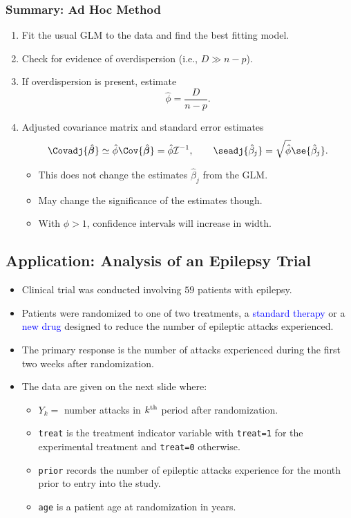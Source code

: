 \documentclass[oneside]{book}\usepackage[]{graphicx}\usepackage[svgnames]{xcolor}
\providecommand{\Vector}[1]{\bm{#1}}%
\begin{document}
\subsubsection*{Summary: Ad Hoc Method}
\begin{enumerate}[1.]
    \item Fit the usual GLM to the data and find the best fitting model.
    \item Check for evidence of overdispersion (i.e., $ D\gg n-p $).
    \item If overdispersion is present, estimate
          \[ \hat{\phi}=\frac{D}{n-p}. \]
    \item Adjusted covariance matrix and standard error estimates
          \[ \Covadj{\hat{\Vector{\beta}}}\simeq \hat{\phi}\Cov{\hat{\Vector{\beta}}}=\hat{\phi}\mathcal{I}^{-1},
              \qquad \seadj{\hat{\beta}_j}=\sqrt{\hat{\phi}}\se{\hat{\beta}_j}. \]
          \begin{itemize}
              \item This does not change the estimates $ \hat{\beta}_j $ from the GLM.
              \item May change the significance of the estimates though.
              \item With $ \phi>1 $, confidence intervals will increase in width.
          \end{itemize}
\end{enumerate}
\subsection*{Application: Analysis of an Epilepsy Trial}
\begin{itemize}
    \item Clinical trial was conducted involving $59$ patients with epilepsy.
    \item Patients were randomized to one of two treatments, a \textcolor{Blue}{standard therapy} or a \textcolor{Blue}{new drug}
          designed to reduce the number of epileptic attacks experienced.
    \item The primary response is the number of attacks experienced during the first two
          weeks after randomization.
    \item The data are given on the next slide where:
          \begin{itemize}
              \item $ Y_k= $ number attacks in $ k\textsuperscript{th} $ period after randomization.
              \item \texttt{treat} is the treatment indicator variable with \texttt{treat=1} for the experimental treatment
                    and \texttt{treat=0} otherwise.
              \item \texttt{prior} records the number of epileptic attacks experience for the month prior to entry into the study.
              \item \texttt{age} is a patient age at randomization in years.
          \end{itemize}
\end{itemize}
\end{document}
